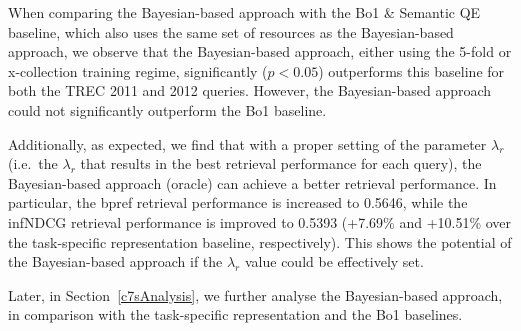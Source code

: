 \documentclass[1p]{elsarticle}
\begin{document}
When comparing the Bayesian-based approach with the Bo1 \& Semantic QE baseline, which also uses the same set of resources as the Bayesian-based approach, we observe that the Bayesian-based approach, either using the 5-fold or x-collection training regime, significantly ($p<0.05$) outperforms this baseline for both the TREC 2011 and 2012 queries. However, the Bayesian-based approach could not significantly outperform the Bo1 baseline.


Additionally, as expected, we find that with a proper setting of the parameter $\lambda_r$ (i.e.\ the $\lambda_r$ that results in the best retrieval performance for each query), the Bayesian-based approach (oracle) can achieve a better retrieval performance. 
In particular, the bpref retrieval performance is increased to 0.5646, while the infNDCG retrieval performance is improved to 0.5393 (+7.69\% and +10.51\% over the task-specific representation baseline, respectively). This shows the potential of the Bayesian-based approach if the $\lambda_r$ value could be effectively set. 


Later, in Section~\ref{c7sAnalysis}, we further analyse the Bayesian-based approach, in comparison with the task-specific representation and the Bo1 baselines.

\end{document}
